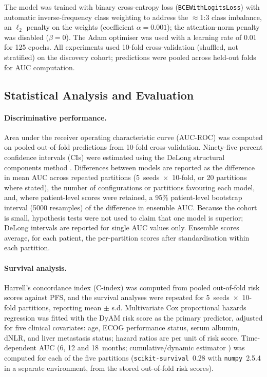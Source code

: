 The model was trained with binary cross-entropy loss
(\texttt{BCEWithLogitsLoss}) with automatic inverse-frequency class
weighting to address the $\approx$1:3 class imbalance,
an $\ell_2$ penalty on the weights (coefficient $\alpha = 0.001$);
the attention-norm penalty was disabled ($\beta = 0$).
The Adam optimiser was used with a learning rate of 0.01 for 125 epochs.
All experiments used 10-fold cross-validation (shuffled, not stratified) on the
discovery cohort; predictions were pooled across held-out folds for
AUC computation.


\subsection{Statistical Analysis and Evaluation}
\label{sec:stats}

\paragraph{Discriminative performance.}
Area under the receiver operating characteristic curve (AUC-ROC) was
computed on pooled out-of-fold predictions from 10-fold cross-validation.
Ninety-five percent confidence intervals (CIs) were estimated using the
DeLong structural components method \cite{DeLong1988}.
Differences between models are reported as the difference in mean AUC across
repeated partitions (5~seeds~$\times$~10-fold, or 20 partitions where stated), the
number of configurations or partitions favouring each model, and, where patient-level
scores were retained, a 95\% patient-level bootstrap interval (5000 resamples) of
the difference in ensemble AUC. Because the cohort is small, hypothesis tests were not
used to claim that one model is superior; DeLong intervals are reported for single
AUC values only. Ensemble scores average, for each patient, the per-partition scores
after standardisation within each partition.

\paragraph{Survival analysis.}
Harrell's concordance index (C-index) \cite{Harrell1996} was computed from
pooled out-of-fold risk scores against PFS, and the survival analyses were repeated for
5~seeds~$\times$~10-fold partitions, reporting mean $\pm$ s.d.
Multivariate Cox proportional hazards regression was fitted with the
DyAM risk score as the primary predictor, adjusted for five clinical
covariates: age, ECOG performance status, serum albumin, dNLR, and
liver metastasis status; hazard ratios are per unit of risk score.
Time-dependent AUC (6, 12 and 18~months; cumulative/dynamic estimator
\cite{Uno2007,Hung2010}) was computed for each of the five partitions
(\texttt{scikit-survival}~0.28 with \texttt{numpy}~2.5.4 in a separate environment, from the stored out-of-fold
risk scores).

